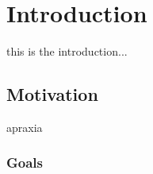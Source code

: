 \chapter{Introduction}

\label{Chapter1_introduction} 

\begin{comment}
-------------------------------------------------
1. Introduction
-------------------------------------------------

introduce clinicians. 


\end{comment}

this is the introduction...


\section{Motivation}
apraxia
	
\subsection{Goals}
